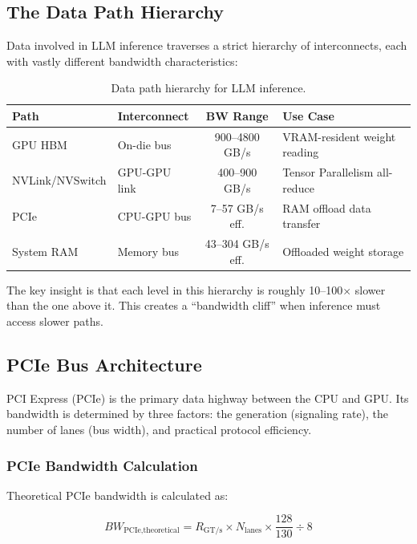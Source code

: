 \documentclass[11pt,a4paper]{article}
\theoremstyle{definition}
\begin{document}
\subsection{The Data Path Hierarchy}

Data involved in LLM inference traverses a strict hierarchy of interconnects, each with vastly different bandwidth characteristics:

\begin{table}[htbp]
\centering
\caption{Data path hierarchy for LLM inference.}\label{tab:datapath}
\begin{tabularx}{0.95\textwidth}{llcX}
\toprule
\textbf{Path} & \textbf{Interconnect} & \textbf{BW Range} & \textbf{Use Case} \\
\midrule
GPU HBM & On-die bus & 900--4800 GB/s & VRAM-resident weight reading \\
NVLink/NVSwitch & GPU-GPU link & 400--900 GB/s & Tensor Parallelism all-reduce \\
PCIe & CPU-GPU bus & 7--57 GB/s eff. & RAM offload data transfer \\
System RAM & Memory bus & 43--304 GB/s eff. & Offloaded weight storage \\
\bottomrule
\end{tabularx}
\end{table}

The key insight is that each level in this hierarchy is roughly 10--100$\times$ slower than the one above it. This creates a ``bandwidth cliff'' when inference must access slower paths.

\subsection{PCIe Bus Architecture}

PCI Express (PCIe) is the primary data highway between the CPU and GPU. Its bandwidth is determined by three factors: the generation (signaling rate), the number of lanes (bus width), and practical protocol efficiency.

\subsubsection{PCIe Bandwidth Calculation}

Theoretical PCIe bandwidth is calculated as:

\begin{equation}\label{eq:pcie_bw}
BW_{\text{PCIe,theoretical}} = R_{\text{GT/s}} \times N_{\text{lanes}} \times \frac{128}{130} \div 8
\end{equation}
\end{document}

